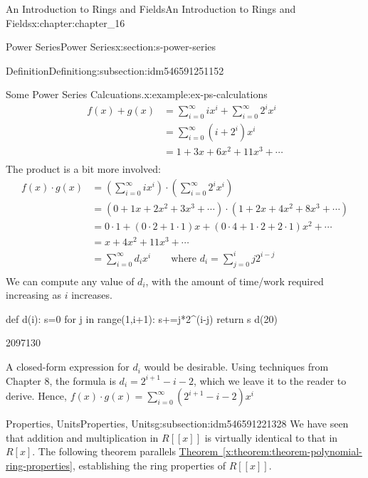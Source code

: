 \documentclass[oneside,10pt,]{book}
\newcommand{\xreffont}{\relax}
\numberwithin{equation}{section}
\begin{document}
\begin{chapterptx}{An Introduction to Rings and Fields}{}{An Introduction to Rings and Fields}{}{}{x:chapter:chapter_16}
\begin{sectionptx}{Power Series}{}{Power Series}{}{}{x:section:s-power-series}
\begin{subsectionptx}{Definition}{}{Definition}{}{}{g:subsection:idm546591251152}
\begin{example}{Some Power Series Calcuations.}{x:example:ex-ps-calculations}
\begin{equation*}
\begin{split}
f(x) + g(x) & =\sum_{i=0}^{\infty } i x^i+\sum_{i=0}^{\infty } 2^i x^i\\
&=\sum_{i=0}^{\infty} \left(i+2^i\right) x^i\\
& =1+3x+6x^2+11x^3+ \cdots\\
\end{split}
\end{equation*}
The product is a bit more involved:%
\begin{equation*}
\begin{split}
f(x) \cdot g(x) & =\left(\sum_{i=0}^{\infty } i x^i\right)\cdot \left(\sum_{i=0}^{\infty } 2^i x^i\right)\\
&=\left(0+ 1 x+2 x^2+3x^3+ \cdots \right)\cdot \left(1 +2 x+4 x^2+8x^3+ \cdots \right)\\
&=0\cdot 1 + (0\cdot 2 + 1\cdot 1)x + (0\cdot 4+1\cdot 2+2\cdot 1)x^2+ \cdots\\
&= x + 4 x^2+ 11 x^3 + \cdots\\
&= \sum_{i=0}^{\infty } d_i x^i\quad\quad\textrm{where } d_i= \sum_{j=0}^i j 2^{i-j}\\
\end{split}
\end{equation*}
We can compute any value of \(d_i\), with the amount of time\slash{}work required increasing as \(i\) increases.%
\begin{sageinput}
def d(i):
    s=0
    for j in range(1,i+1):
        s+=j*2^(i-j)
    return s
d(20)
\end{sageinput}
\begin{sageoutput}
2097130
\end{sageoutput}
A closed-form expression for \(d_i\) would be desirable.  Using techniques from Chapter 8,  the formula is  \(d_i=2^{i+1}-i-2\), which we leave it to the reader to derive.  Hence, \(f(x)\cdot g(x) =\sum_{i=0}^{\infty } (2^{i+1}-i-2) x^i\)%
\end{example}
\end{subsectionptx}
%
%
\typeout{************************************************}
\typeout{************************************************}
%
\begin{subsectionptx}{Properties, Units}{}{Properties, Units}{}{}{g:subsection:idm546591221328}
We have seen that addition and multiplication in \(R[[x]]\) is virtually identical to that in \(R[x]\). The following theorem parallels \hyperref[x:theorem:theorem-polynomial-ring-properties]{Theorem~{\xreffont\ref{x:theorem:theorem-polynomial-ring-properties}}}, establishing the ring properties of \(R[[x]]\).%

\end{subsectionptx}
\end{sectionptx}
\end{chapterptx}
\end{document}
